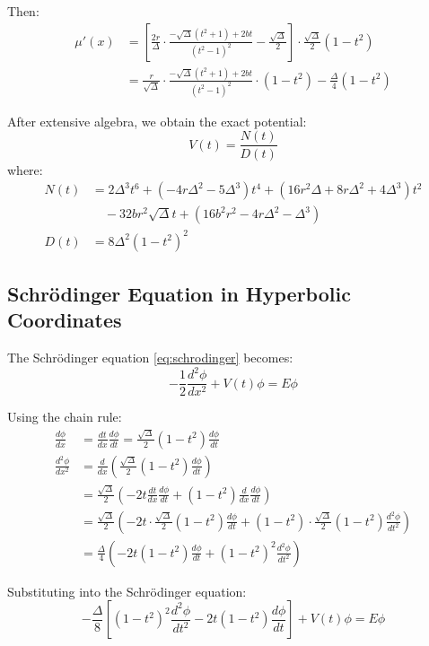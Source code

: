 \documentclass[a4paper,11pt]{article}
\begin{document}
Then:
\begin{align}
\mu'(x) &= \left[\frac{2r}{\Delta}\cdot\frac{-\sqrt{\Delta}(t^2 + 1) + 2bt}{(t^2 - 1)^2} - \frac{\sqrt{\Delta}}{2}\right]\cdot\frac{\sqrt{\Delta}}{2}(1 - t^2) \\
&= \frac{r}{\sqrt{\Delta}}\cdot\frac{-\sqrt{\Delta}(t^2 + 1) + 2bt}{(t^2 - 1)^2}\cdot(1 - t^2) - \frac{\Delta}{4}(1 - t^2)
\end{align}

After extensive algebra, we obtain the exact potential:
\begin{equation}
V(t) = \frac{N(t)}{D(t)}
\end{equation}
where:
\begin{align}
N(t) &= 2\Delta^3t^6 + (-4r\Delta^2 - 5\Delta^3)t^4 + (16r^2\Delta + 8r\Delta^2 + 4\Delta^3)t^2 \\
&\quad - 32br^2\sqrt{\Delta}t + (16b^2r^2 - 4r\Delta^2 - \Delta^3) \\
D(t) &= 8\Delta^2(1 - t^2)^2
\end{align}

\subsection{Schrödinger Equation in Hyperbolic Coordinates}

The Schrödinger equation \eqref{eq:schrodinger} becomes:
\begin{equation}
-\frac{1}{2}\frac{d^2\phi}{dx^2} + V(t)\phi = E\phi
\end{equation}

Using the chain rule:
\begin{align}
\frac{d\phi}{dx} &= \frac{dt}{dx}\frac{d\phi}{dt} = \frac{\sqrt{\Delta}}{2}(1 - t^2)\frac{d\phi}{dt} \\
\frac{d^2\phi}{dx^2} &= \frac{d}{dx}\left(\frac{\sqrt{\Delta}}{2}(1 - t^2)\frac{d\phi}{dt}\right) \\
&= \frac{\sqrt{\Delta}}{2}\left(-2t\frac{dt}{dx}\frac{d\phi}{dt} + (1 - t^2)\frac{d}{dx}\frac{d\phi}{dt}\right) \\
&= \frac{\sqrt{\Delta}}{2}\left(-2t\cdot\frac{\sqrt{\Delta}}{2}(1 - t^2)\frac{d\phi}{dt} + (1 - t^2)\cdot\frac{\sqrt{\Delta}}{2}(1 - t^2)\frac{d^2\phi}{dt^2}\right) \\
&= \frac{\Delta}{4}\left(-2t(1 - t^2)\frac{d\phi}{dt} + (1 - t^2)^2\frac{d^2\phi}{dt^2}\right)
\end{align}

Substituting into the Schrödinger equation:
\begin{equation}
-\frac{\Delta}{8}\left[(1 - t^2)^2\frac{d^2\phi}{dt^2} - 2t(1 - t^2)\frac{d\phi}{dt}\right] + V(t)\phi = E\phi
\end{equation}
\end{document}
